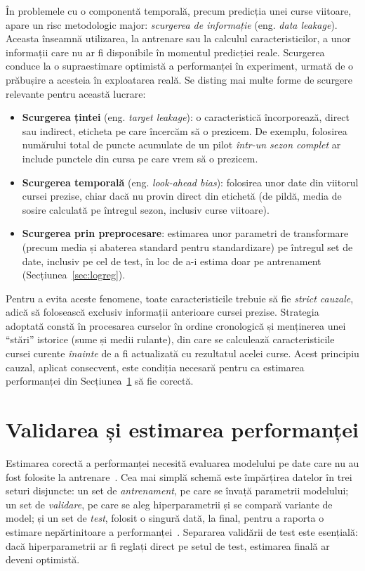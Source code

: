 \documentclass[12pt,a4paper]{report}
\begin{document}
În problemele cu o componentă temporală, precum predicția unei curse viitoare, apare un risc
metodologic major: \emph{scurgerea de informație} (eng. \emph{data leakage}). Aceasta înseamnă
utilizarea, la antrenare sau la calculul caracteristicilor, a unor informații care nu ar fi
disponibile în momentul predicției reale. Scurgerea conduce la o supraestimare optimistă a
performanței în experiment, urmată de o prăbușire a acesteia în exploatarea reală. Se disting mai
multe forme de scurgere relevante pentru această lucrare:
\begin{itemize}
  \item \textbf{Scurgerea țintei} (eng. \emph{target leakage}): o caracteristică încorporează,
    direct sau indirect, eticheta pe care încercăm să o prezicem. De exemplu, folosirea
    numărului total de puncte acumulate de un pilot \emph{într-un sezon complet} ar include
    punctele din cursa pe care vrem să o prezicem.
  \item \textbf{Scurgerea temporală} (eng. \emph{look-ahead bias}): folosirea unor date din
    viitorul cursei prezise, chiar dacă nu provin direct din etichetă (de pildă, media de sosire
    calculată pe întregul sezon, inclusiv curse viitoare).
  \item \textbf{Scurgerea prin preprocesare}: estimarea unor parametri de transformare (precum
    media și abaterea standard pentru standardizare) pe întregul set de date, inclusiv pe cel de
    test, în loc de a-i estima doar pe antrenament (Secțiunea~\ref{sec:logreg}).
\end{itemize}

Pentru a evita aceste fenomene, toate caracteristicile trebuie să fie \emph{strict cauzale},
adică să folosească exclusiv informații anterioare cursei prezise. Strategia adoptată constă în
procesarea curselor în ordine cronologică și menținerea unei ``stări'' istorice (sume și medii
rulante), din care se calculează caracteristicile cursei curente \emph{înainte} de a fi
actualizată cu rezultatul acelei curse. Acest principiu cauzal, aplicat consecvent, este condiția
necesară pentru ca estimarea performanței din Secțiunea~\ref{sec:validare} să fie corectă.

\section{Validarea și estimarea performanței}
\label{sec:validare}

Estimarea corectă a performanței necesită evaluarea modelului pe date care nu au fost folosite la
antrenare~\cite{kohavi1995study}. Cea mai simplă schemă este împărțirea datelor în trei seturi
disjuncte: un set de \emph{antrenament}, pe care se învață parametrii modelului; un set de
\emph{validare}, pe care se aleg hiperparametrii și se compară variante de model; și un set de
\emph{test}, folosit o singură dată, la final, pentru a raporta o estimare nepărtinitoare a
performanței~\cite{hastie2009elements}. Separarea validării de test este esențială: dacă
hiperparametrii ar fi reglați direct pe setul de test, estimarea finală ar deveni optimistă.
\end{document}
